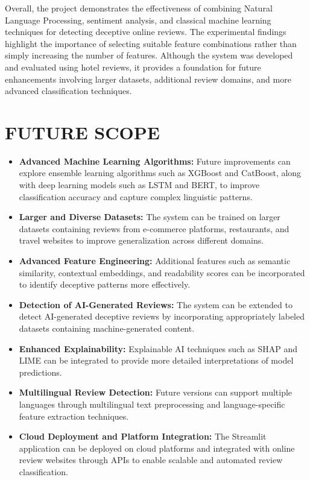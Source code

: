 \documentclass[12pt,a4paper]{report}
\begin{document}
Overall, the project demonstrates the effectiveness of
combining Natural Language Processing, sentiment analysis,
and classical machine learning techniques for detecting
deceptive online reviews. The experimental findings highlight
the importance of selecting suitable feature combinations
rather than simply increasing the number of features.
Although the system was developed and evaluated using
hotel reviews, it provides a foundation for future
enhancements involving larger datasets, additional review
domains, and more advanced classification techniques.

\newpage

\chapter{FUTURE SCOPE}

\begin{itemize}

    \item \textbf{Advanced Machine Learning Algorithms:}
    Future improvements can explore ensemble learning
    algorithms such as XGBoost and CatBoost, along with
    deep learning models such as LSTM and BERT, to improve
    classification accuracy and capture complex
    linguistic patterns.

    \item \textbf{Larger and Diverse Datasets:}
    The system can be trained on larger datasets containing
    reviews from e-commerce platforms, restaurants, and
    travel websites to improve generalization across
    different domains.

    \item \textbf{Advanced Feature Engineering:}
    Additional features such as semantic similarity,
    contextual embeddings, and readability scores can
    be incorporated to identify deceptive patterns
    more effectively.

    \item \textbf{Detection of AI-Generated Reviews:}
    The system can be extended to detect AI-generated
    deceptive reviews by incorporating appropriately
    labeled datasets containing machine-generated content.

    \item \textbf{Enhanced Explainability:}
    Explainable AI techniques such as SHAP and LIME
    can be integrated to provide more detailed
    interpretations of model predictions.

    \item \textbf{Multilingual Review Detection:}
    Future versions can support multiple languages
    through multilingual text preprocessing and
    language-specific feature extraction techniques.

    \item \textbf{Cloud Deployment and Platform Integration:}
    The Streamlit application can be deployed on cloud
    platforms and integrated with online review websites
    through APIs to enable scalable and automated
    review classification.

\end{itemize}
\end{document}
